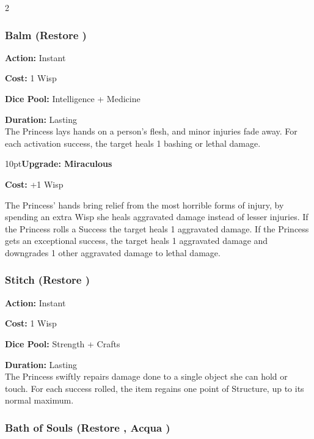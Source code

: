 \begin{multicols}{2}
\subsubsection*{Balm (Restore \textbullet\textbullet)}

\noindent \textbf{Action:} Instant 

\noindent \textbf{Cost:} 1 Wisp

\noindent \textbf{Dice Pool:} Intelligence  + Medicine

\noindent \textbf{Duration:} Lasting \\

\noindent The Princess lays hands on a person's flesh, and minor injuries fade away. For each activation success, the target heals 1 bashing or lethal damage.

\begin{myindentpar}{10pt}\textbf{Upgrade: Miraculous}

\noindent \textbf{Cost:} +1 Wisp

The Princess' hands bring relief from the most horrible forms of injury, by spending an extra Wisp she heals aggravated damage instead of lesser injuries. If the Princess rolls a Success the target heals 1 aggravated damage. If the Princess gets an exceptional success, the target heals 1 aggravated damage and downgrades 1 other aggravated damage to lethal damage.\end{myindentpar}

\subsubsection*{Stitch (Restore \textbullet\textbullet)}

\noindent \textbf{Action:} Instant

\noindent \textbf{Cost:} 1 Wisp

\noindent \textbf{Dice Pool:} Strength + Crafts

\noindent \textbf{Duration:} Lasting \\

\noindent The Princess swiftly repairs damage done to a single object she can hold or touch. For each success rolled, the item regains one point of Structure, up to its normal maximum.

\subsubsection*{Bath of Souls (Restore \textbullet\textbullet, Acqua \textbullet)}


\end{multicols}

